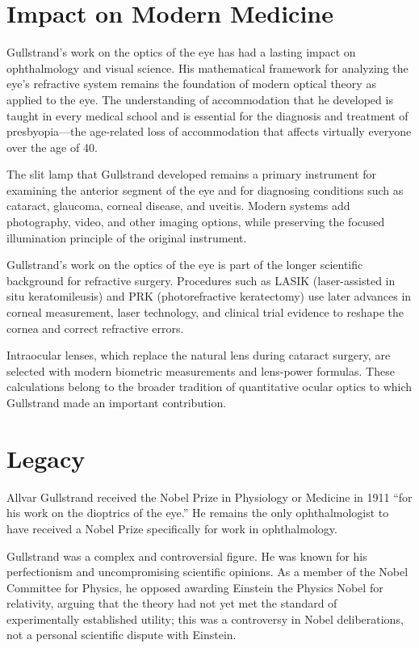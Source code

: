 \section{Impact on Modern Medicine}

Gullstrand's work on the optics of the eye has had a lasting impact on ophthalmology and visual science. His mathematical framework for analyzing the eye's refractive system remains the foundation of modern optical theory as applied to the eye. The understanding of accommodation that he developed is taught in every medical school and is essential for the diagnosis and treatment of presbyopia---the age-related loss of accommodation that affects virtually everyone over the age of 40.

The slit lamp that Gullstrand developed remains a primary instrument for examining the anterior segment of the eye and for diagnosing conditions such as cataract, glaucoma, corneal disease, and uveitis. Modern systems add photography, video, and other imaging options, while preserving the focused illumination principle of the original instrument.\cite{gullstrand-biographical}

Gullstrand's work on the optics of the eye is part of the longer scientific background for refractive surgery. Procedures such as LASIK (laser-assisted in situ keratomileusis) and PRK (photorefractive keratectomy) use later advances in corneal measurement, laser technology, and clinical trial evidence to reshape the cornea and correct refractive errors.

Intraocular lenses, which replace the natural lens during cataract surgery, are selected with modern biometric measurements and lens-power formulas. These calculations belong to the broader tradition of quantitative ocular optics to which Gullstrand made an important contribution.

\section{Legacy}

Allvar Gullstrand received the Nobel Prize in Physiology or Medicine in 1911 ``for his work on the dioptrics of the eye.'' He remains the only ophthalmologist to have received a Nobel Prize specifically for work in ophthalmology.\cite{gullstrand-history}

Gullstrand was a complex and controversial figure. He was known for his perfectionism and uncompromising scientific opinions. As a member of the Nobel Committee for Physics, he opposed awarding Einstein the Physics Nobel for relativity, arguing that the theory had not yet met the standard of experimentally established utility; this was a controversy in Nobel deliberations, not a personal scientific dispute with Einstein.\cite{gullstrand-biographical,gullstrand-history}

